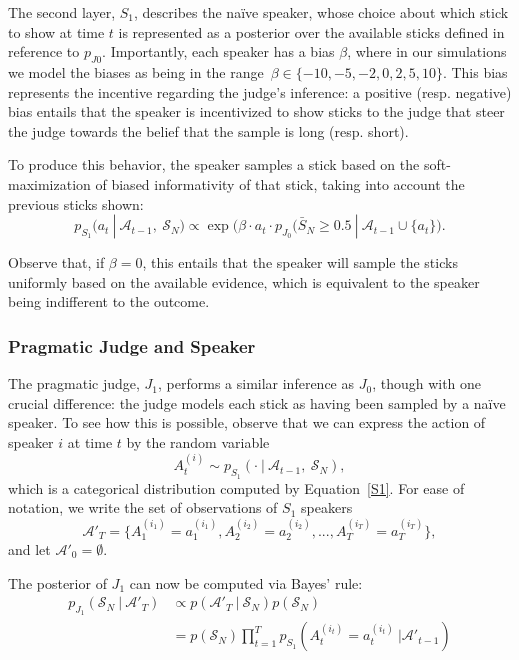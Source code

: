 \documentclass[10pt,letterpaper]{article}
\begin{document}
The second layer, $S_1$, describes the na\"ive speaker, whose choice about which stick to show
at time $t$ is represented as a posterior over the available sticks defined in reference to $p_{J0}$.
Importantly, each speaker has a bias $\beta$, where in our simulations we model the biases as being
in the range~${\beta \in \{-10, -5, -2, 0, 2, 5, 10\}}$. This bias represents the incentive regarding the judge's
inference: a positive (resp. negative) bias entails that the speaker is incentivized to show sticks to the judge
that steer the judge towards the belief that the sample is long (resp. short).

To produce this behavior, the speaker samples a stick based on the soft-maximization of biased informativity
of that stick, taking into account the previous sticks shown:
\begin{equation}\label{S1}
p_{S_1} (a_t \ | \ \mathcal{A}_{t-1},\ \mathcal{S}_N) \propto \exp \bigl(\beta \cdot a_t \cdot p_{J_0} (\bar{S}_N \ge 0.5 \ | \ \mathcal{A}_{t-1} \cup \{a_t\} \bigr).
\end{equation}

Observe that, if $\beta = 0$, this entails that the speaker will sample the sticks uniformly based on the available
evidence, which is equivalent to the speaker being indifferent to the outcome.

\subsubsection{Pragmatic Judge and Speaker}
The pragmatic judge, $J_1$, performs a similar inference as $J_0$, though with one crucial difference: the judge
models each stick as having been sampled by a na\"ive speaker. To see how this is possible, observe that we can express
the action of speaker $i$ at time $t$ by the random variable 
\begin{equation}
	A_t^{(i)} \sim p_{S_1} (\cdot \ | \ \mathcal{A}_{t-1},\ \mathcal{S}_N),
\end{equation}
which is a categorical distribution computed by Equation~\ref{S1}. For ease of notation, we write the set
of observations of $S_1$ speakers
\begin{equation}
	\mathcal{A}'_T = \{ A_1^{(i_1)}=a_1^{(i_1)}, A_2^{(i_2)}=a_2^{(i_2)}, ..., A_T^{(i_T)}=a_T^{(i_T)}\}, 
\end{equation}
and let $\mathcal{A}'_0 = \emptyset$.

The posterior of $J_1$ can now be computed via Bayes' rule:
\begin{align*}
	p_{J_1} (\mathcal{S}_N \ | \ \mathcal{A}'_T) &\propto p(\mathcal{A}'_T \ | \ \mathcal{S}_N) p(\mathcal{S}_N) \\
	&=  p(\mathcal{S}_N) \prod_{t=1}^T p_{S_1}(A_t^{(i_t)}=a_t^{(i_t)} \ |  \mathcal{A}'_{t-1})
\end{align*}
\end{document}
